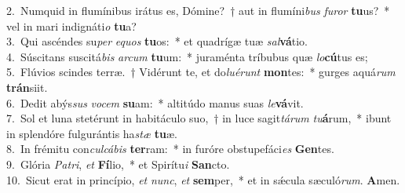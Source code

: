 {2.~}Numquid in flumínibus irátus es, Dómine?~† aut in flumíni\textit{bus} \textit{fu}\textit{ror} \textbf{tu}us?~* vel in mari indignáti\textit{o} \textbf{tu}a?\\
{3.~}Qui ascéndes su\textit{per} \textit{e}\textit{quos} \textbf{tu}os:~* et quadrígæ tuæ \textit{sal}\textbf{vá}tio.\\
{4.~}Súscitans suscitá\textit{bis} \textit{ar}\textit{cum} \textbf{tu}um:~* juraménta tríbubus quæ \textit{lo}\textbf{cú}tus es;\\
{5.~}Flúvios scindes terræ.~† Vidérunt te, et do\textit{lu}\textit{é}\textit{runt} \textbf{mon}tes:~* gurges aquá\textit{rum} \textbf{trán}siit.\\
{6.~}Dedit abýs\textit{sus} \textit{vo}\textit{cem} \textbf{su}am:~* altitúdo manus suas \textit{le}\textbf{vá}vit.\\
{7.~}Sol et luna stetérunt in habitáculo suo,~† in luce sagit\textit{tá}\textit{rum} \textit{tu}\textbf{á}rum,~* ibunt in splendóre fulgurántis ha\textit{stæ} \textbf{tu}æ.\\
{8.~}In frémitu con\textit{cul}\textit{cá}\textit{bis} \textbf{ter}ram:~* in furóre obstupefáci\textit{es} \textbf{Gen}tes.\\
{9.~}Glória \textit{Pa}\textit{tri}, \textit{et} \textbf{Fí}lio,~* et Spirítu\textit{i} \textbf{San}cto.\\
{10.~}Sicut erat in princípio, \textit{et} \textit{nunc}, \textit{et} \textbf{sem}per,~* et in sǽcula sæculó\textit{rum}. \textbf{A}men.\\
